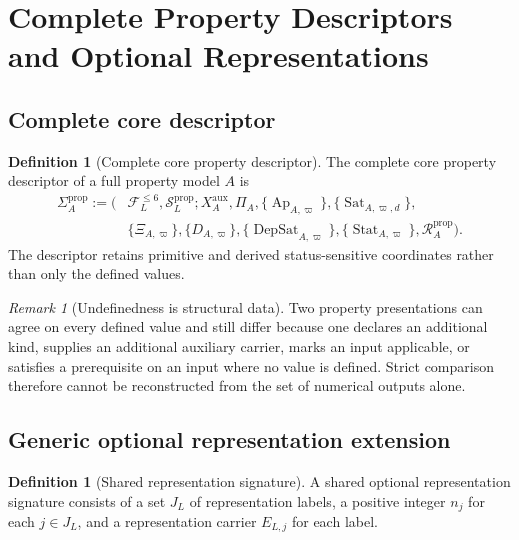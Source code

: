 \documentclass[11pt]{article}
\newcommand{\FVI}{\mathcal F_{L}^{\le 6}}
\newcommand{\Sprop}{\mathcal S_{L}^{\mathrm{prop}}}
\newcommand{\Ap}{\operatorname{Ap}}
\newcommand{\DepSat}{\operatorname{DepSat}}
\newcommand{\Sat}{\operatorname{Sat}}
\newcommand{\Stat}{\operatorname{Stat}}
\newcommand{\PropRec}{\mathcal R^{\mathrm{prop}}}
\theoremstyle{definition}
\newtheorem{definition}[theorem]{Definition}
\theoremstyle{remark}
\newtheorem{remark}[theorem]{Remark}
\begin{document}
\section{Complete Property Descriptors and Optional Representations}
\label{sec:descriptor-representation}

\subsection{Complete core descriptor}

\begin{definition}[Complete core property descriptor]
\label{def:descriptor}
The complete core property descriptor of a full property model \(A\) is
\[
\begin{aligned}
\Sigma_A^{\mathrm{prop}}:=\bigl(&\FVI,\Sprop;
X_A^{\mathrm{aux}},\Pi_A,
\{\Ap_{A,\varpi}\},\{\Sat_{A,\varpi,d}\},\\
&\{\Xi_{A,\varpi}\},\{D_{A,\varpi}\},
\{\DepSat_{A,\varpi}\},\{\Stat_{A,\varpi}\},\PropRec_A\bigr).
\end{aligned}
\]
The descriptor retains primitive and derived status-sensitive coordinates rather than only the defined values.
\end{definition}

\begin{remark}[Undefinedness is structural data]
Two property presentations can agree on every defined value and still differ because one declares an additional kind, supplies an additional auxiliary carrier, marks an input applicable, or satisfies a prerequisite on an input where no value is defined.
Strict comparison therefore cannot be reconstructed from the set of numerical outputs alone.
\end{remark}

\subsection{Generic optional representation extension}

\begin{definition}[Shared representation signature]
A shared optional representation signature consists of a set \(J_L\) of representation labels, a positive integer \(n_j\) for each \(j\in J_L\), and a representation carrier \(E_{L,j}\) for each label.
\end{definition}
\end{document}
